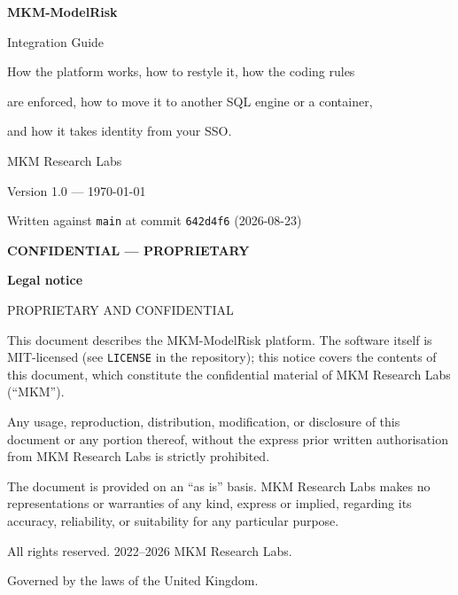 \documentclass[11pt]{article}
\begin{document}
\begin{titlepage}\begin{center}
\vspace*{2cm}
{\Huge\bfseries\textcolor{mkmblue}{MKM-ModelRisk}\par}\vspace{0.6cm}
{\LARGE\textcolor{mkmchrome}{Integration Guide}\par}\vspace{1.2cm}
{\large How the platform works, how to restyle it, how the coding rules\par
 are enforced, how to move it to another SQL engine or a container,\par
 and how it takes identity from your SSO.\par}\vspace{2.5cm}
{\large MKM Research Labs\par}\vspace{0.4cm}
{\large Version 1.0 --- \today\par}\vspace{0.4cm}
{\large Written against \texttt{main} at commit \texttt{642d4f6} (2026-08-23)\par}
\vspace{2cm}\textcolor{mkmred}{\textbf{CONFIDENTIAL --- PROPRIETARY}}
\end{center}
\vfill
\begin{minipage}{\textwidth}\footnotesize\raggedright
\textbf{Legal notice}\par\medskip
PROPRIETARY AND CONFIDENTIAL\par\medskip
This document describes the MKM-ModelRisk platform. The software itself is
MIT-licensed (see \texttt{LICENSE} in the repository); this notice covers the contents of
this document, which constitute the confidential material of MKM Research Labs
(``MKM'').\par\medskip
Any usage, reproduction, distribution, modification, or disclosure of this document or any
portion thereof, without the express prior written authorisation from MKM Research Labs is
strictly prohibited.\par\medskip
The document is provided on an ``as is'' basis. MKM Research Labs makes no representations
or warranties of any kind, express or implied, regarding its accuracy, reliability, or
suitability for any particular purpose.\par\medskip
All rights reserved. \textcopyright{} 2022--2026 MKM Research Labs.\par\medskip
Governed by the laws of the United Kingdom.
\end{minipage}
\end{titlepage}
\end{document}
